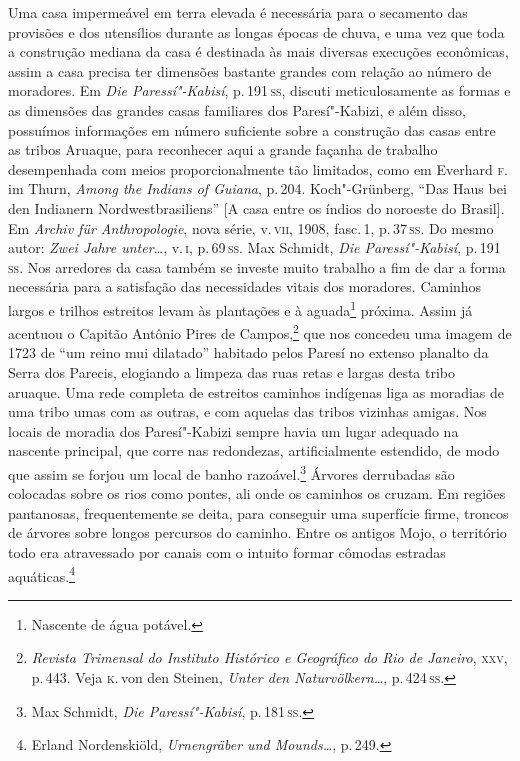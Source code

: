 Uma casa impermeável em terra elevada é necessária para o secamento das
provisões e dos utensílios durante as longas épocas de chuva, e uma vez
que toda a construção mediana da casa é destinada às mais diversas
execuções econômicas, assim a casa precisa ter dimensões bastante
grandes com relação ao número de moradores. Em \textit{Die Paressí"-Kabisí}, p.\,191\,\textsc{ss}, discuti meticulosamente as formas e as dimensões das grandes casas familiares dos Paresí"-Kabizi, e além disso, possuímos informações em número suficiente sobre a construção das casas entre as tribos Aruaque, para reconhecer aqui a grande façanha de trabalho desempenhada com meios proporcionalmente tão limitados, como em Everhard \textsc{f}.\,im Thurn, \textit{Among the Indians of Guiana}, p.\,204. Koch"-Grünberg, ``Das Haus bei den Indianern Nordwestbrasiliens'' {[}A casa entre os índios do noroeste do Brasil{]}. Em \textit{Archiv für Anthropologie}, nova série, v.\,\textsc{vii}, 1908, fasc.\,1, p.\,37\,\textsc{ss}. Do mesmo autor: \textit{Zwei Jahre unter\ldots}, v.\,\textsc{i}, p.\,69\,\textsc{ss}. Max Schmidt, \textit{Die Paressí"-Kabisí}, p.\,191\,\textsc{ss}. Nos arredores da casa também
se investe muito trabalho a fim de dar a forma necessária para a
satisfação das necessidades vitais dos moradores. Caminhos largos e
trilhos estreitos levam às plantações e à aguada\footnote{Nascente de água potável.} próxima. Assim já
acentuou o Capitão Antônio Pires de Campos,\footnote{\textit{Revista
  Trimensal do Instituto Histórico e Geográfico do Rio de Janeiro}, \textsc{xxv},
  p.\,443. Veja \textsc{k}.\,von den Steinen, \textit{Unter den Naturvölkern\ldots}, p.\,424\,\textsc{ss}.} que nos concedeu uma imagem de 1723
de ``um reino mui dilatado'' habitado pelos Paresí no extenso planalto
da Serra dos Parecis, elogiando a limpeza das ruas retas e largas desta
tribo aruaque. Uma rede completa de estreitos caminhos indígenas liga as
moradias de uma tribo umas com as outras, e com aquelas das tribos
vizinhas amigas. Nos locais de moradia dos Paresí"-Kabizi sempre havia um
lugar adequado na nascente principal, que corre nas redondezas,
artificialmente estendido, de modo que assim se forjou um local de banho
razoável.\footnote{Max Schmidt, \textit{Die Paressí"-Kabisí}, p.\,181\,\textsc{ss}.}
Árvores derrubadas são colocadas sobre os rios como pontes, ali onde os
caminhos os cruzam. Em regiões pantanosas, frequentemente se deita, para conseguir
uma superfície firme,
troncos de árvores sobre longos percursos do caminho. Entre os antigos Mojo, o território todo era
atravessado por canais com o intuito formar cômodas estradas aquáticas.\footnote{Erland
  Nordenskiöld, \textit{Urnengräber und Mounds\ldots}, p.\,249.}

